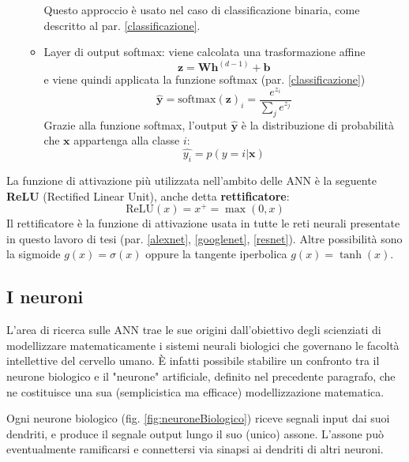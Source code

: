 \begin{itemize}
\begin{itemize}
\begin{equation*}
\end{equation*}
Questo approccio è usato nel caso di classificazione binaria, come descritto al par. \ref{classificazione}.
\item Layer di output softmax: viene calcolata una trasformazione affine
\begin{equation*}
\mathbf{z}=\mathbf{W}\mathbf{h}^{(d-1)}+\mathbf{b}
\end{equation*}
e viene quindi applicata la funzione softmax (par. \ref{classificazione})
\begin{equation*}
\mathbf{\widehat{y}}=\text{softmax}(\mathbf{z})_i=\frac{e^{z_i}}{\sum\nolimits_{j}e^{z_j}}
\end{equation*}
Grazie alla funzione softmax, l'output $\mathbf{\widehat{y}}$ è la distribuzione di probabilità che $\mathbf{x}$ appartenga alla classe $i$:
\begin{equation*}
\widehat{y_i}=p(y=i|\mathbf{x})
\end{equation*}
\end{itemize}
\end{itemize}

La funzione di attivazione più utilizzata nell'ambito delle ANN è la seguente \textbf{ReLU} (Rectified Linear Unit), anche detta \textbf{rettificatore}:
\[\text{ReLU}(x)=x^{+}=\max(0,x)\]
Il rettificatore è la funzione di attivazione usata in tutte le reti neurali presentate in questo lavoro di tesi (par. \ref{alexnet}, \ref{googlenet}, \ref{resnet}).
Altre possibilità sono la sigmoide $g(x)=\sigma(x)$ oppure la tangente iperbolica $g(x)=\tanh(x)$.\\

\subsection{I neuroni}
\label{neuroni}
L'area di ricerca sulle ANN trae le sue origini dall'obiettivo degli scienziati di modellizzare matematicamente i sistemi neurali biologici che governano le facoltà intellettive del cervello umano.
È infatti possibile stabilire un confronto tra il neurone biologico e il "neurone" artificiale, definito nel precedente paragrafo, che ne costituisce una sua (semplicistica ma efficace) modellizzazione matematica.

Ogni neurone biologico (fig. \ref{fig:neuroneBiologico}) riceve segnali input dai suoi dendriti, e produce il segnale output lungo il suo (unico) assone. L'assone può eventualmente ramificarsi e connettersi via sinapsi ai dendriti di altri neuroni.

